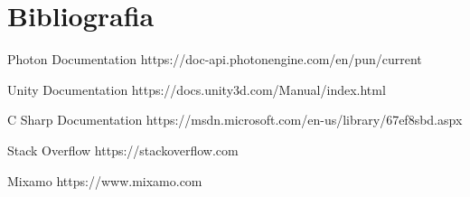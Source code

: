 \section{Bibliografia}

Photon Documentation https://doc-api.photonengine.com/en/pun/current

Unity Documentation https://docs.unity3d.com/Manual/index.html

C Sharp Documentation https://msdn.microsoft.com/en-us/library/67ef8sbd.aspx

Stack Overflow https://stackoverflow.com

Mixamo https://www.mixamo.com
